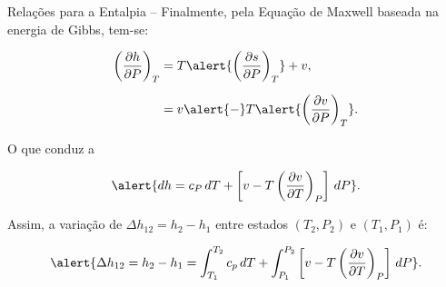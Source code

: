 \begin{frame}[allowframebreaks]{Relações para a Entalpia --}
        \pagebreak
        Finalmente, pela Equação de Maxwell baseada na energia de Gibbs, tem-se:

        \begin{align*}
            \left(\frac{\partial h}{\partial P}\right)_T
            &= T\alert{\left(\frac{\partial s}{\partial P}\right)_T} + v,
            \\[\medskipamount]
            &= v \alert{-} T\alert{\left(\frac{\partial v}{\partial P}\right)_T}.
        \end{align*}

        O que conduz a

        \begin{equation*}
            \alert{
                dh = c_P\,dT +
                \left[
                    v -
                    T\left(
                        \frac{\partial v}{\partial T}
                    \right)_P
                \right]\,dP
            }.
        \end{equation*}

        \pagebreak
        Assim, a variação de \alert{$\Delta h_{12} = h_2 - h_1$} entre estados \alert{$(T_2,
        P_2)$} e \alert{$(T_1, P_1)$} é: \vspace*\bigskipamount

        \begin{equation*}
            \alert{
                \Delta h_{12} = h_2 - h_1 =
                    \int_{T_1}^{T_2}
                        c_p\,dT +
                    \int_{P_1}^{P_2}
                        \left[
                            v - T\left(
                                \frac{\partial v}{\partial T}
                            \right)_P
                        \right]\,dP
            }.
        \end{equation*}

    \end{frame}

